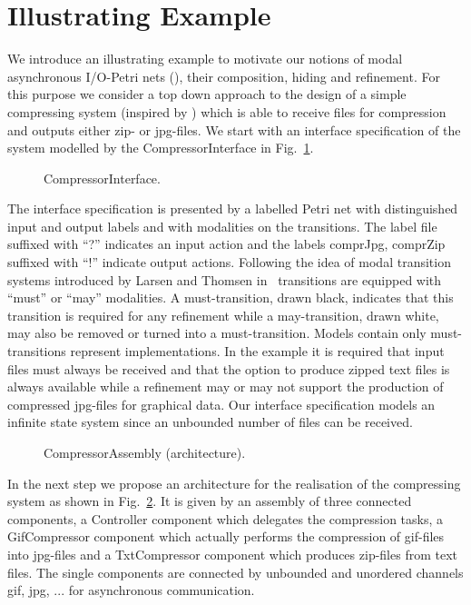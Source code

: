 \section{Illustrating Example}\label{sec:example}

We introduce an illustrating example to motivate our notions of modal asynchronous I/O-Petri nets (\MAIOPNs),
their composition, hiding and refinement. For this purpose we consider a top down approach to the design
of a simple compressing system  (inspired by \cite{BCD02}) which is able to receive files for compression and outputs either zip- or jpg-files.
We start with an interface specification of the system  modelled by the \textsf{CompressorInterface} in  Fig.~\ref{fig:compr-intf}.

\begin{figure}[ht]
	\centering
	
	\caption{\textsf{CompressorInterface}.\label{fig:compr-intf}}
\end{figure}

The interface specification is presented by a labelled Petri net with distinguished input and output labels and with modalities on the transitions.
The label \textsf{file} suffixed with ``?'' indicates an input action and the labels \textsf{comprJpg}, \textsf{comprZip}
 suffixed with ``!'' indicate output actions. Following the idea of modal transition systems introduced by Larsen and Thomsen
in~\cite{DBLP:conf/lics/LarsenT88} transitions are equipped with ``must'' or ``may'' modalities. A must-transition, drawn black, indicates that
this transition is required for any refinement while a may-transition, drawn white, may also be removed or turned
into a must-transition. Models contain only must-transitions represent implementations.
In the example it is required that input files must always be received
and that the option to produce zipped text files is always available while
a refinement may or may not support the production of compressed jpg-files for graphical data.
Our interface specification models an infinite state system since an unbounded number of files can be received. 

\begin{figure}[ht]
	\centering
	
	\caption{\textsf{CompressorAssembly} (architecture).\label{fig:ex-static-structure}}
\end{figure}

In the next step we propose an architecture for the realisation of the compressing system as shown in Fig.~\ref{fig:ex-static-structure}.
It is given by an assembly of three connected components, a \textsf{Controller} component which delegates the compression tasks,
a \textsf{GifCompressor} component which actually performs the compression of gif-files into jpg-files
and a \textsf{TxtCompressor} component which produces zip-files from text files.
The single components are connected by unbounded and unordered channels  \textsf{gif, jpg, ...} for asynchronous communication.

